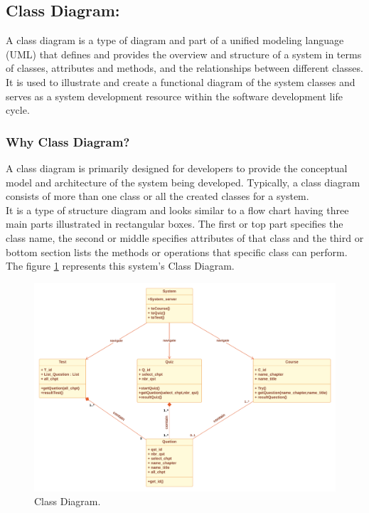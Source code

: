 \subsection{Class Diagram:}
A class diagram is a type of diagram and part of a unified modeling language (UML) that defines and provides the overview and structure of a system in terms of classes, attributes and methods, and the relationships between different classes. \\
It is used to illustrate and create a functional diagram of the system classes and serves as a system development resource within the software development life cycle. \cite{Techopedia-DC} \\
\newpage

\subsubsection{Why Class Diagram?}
A class diagram is primarily designed for developers to provide the conceptual model and architecture of the system being developed. Typically, a class diagram consists of more than one class or all the created classes for a system. \cite{Techopedia-DC} \\
It is a type of structure diagram and looks similar to a flow chart having three main parts illustrated in rectangular boxes. The first or top part specifies the class name, the second or middle specifies attributes of that class and the third or bottom section lists the methods or operations that specific class can perform. \cite{Techopedia-DC} \\

The figure \ref{fig:DC} represents this system's Class Diagram.


\begin{figure}[ht]
	\centering
	\label{}\includegraphics[scale=0.45]{img/UML class.pdf}                
	\caption{Class Diagram.} 
	\label{fig:DC}
\end{figure} 



